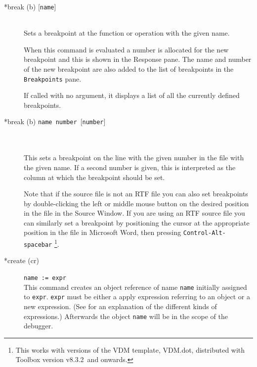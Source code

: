 \documentclass[\pformat,12pt]{article}
\newcommand{\vdmtoolsver}{v8.3.2}
\newcommand{\guicmd}[1]{{\sf #1}}
\begin{document}
\begin{description}

\item[*break (b) \mbox{[{\tt name}]}] 
\mbox{}\\
  Sets a breakpoint at the function or
  operation with the given name.

  When this command is evaluated a number is allocated for the new 
  breakpoint and this is shown in the \guicmd{Response} pane. The name
  and number of the new breakpoint are also added to the list of
  breakpoints in the \texttt{Breakpoints} pane.

  If called with no argument, it displays a list of all the currently 
  defined breakpoints.

\item[*break (b) \mbox{\texttt{name number} [\texttt{number}]}]\mbox{}\\
\mbox{}\\
 This sets a breakpoint on the line with the given number in the file
 with the given name. If a second number is given, this is 
 interpreted as the column at which the breakpoint should be set.

Note that if the source file is not an RTF file you can also set
breakpoints by double-clicking the left or middle mouse button on the
desired position in the file in the \guicmd{Source Window}. If you are
using an RTF source file you can similarly set a breakpoint by
positioning the cursor at the appropriate position in the file in
Microsoft Word, then pressing
\texttt{Control-Alt-spacebar}%
  \footnote{This works with versions of the VDM template,
  VDM.dot, 
  distributed with Toolbox version \vdmtoolsver\
  and onwards.}.


\item[*create (cr)] {\tt name := expr}\mbox{}\\
  This command creates an object reference of name {\tt name}
  initially assigned to {\tt expr}.  {\tt expr} must be either a
  apply expression referring to an object or a new expression. (See
  \cite{LangManPP-SCSK} for an explanation of the different kinds of
  expressions.)  Afterwards the object {\tt name} will be in the scope
  of the debugger.
  

\end{description}
\end{document}

